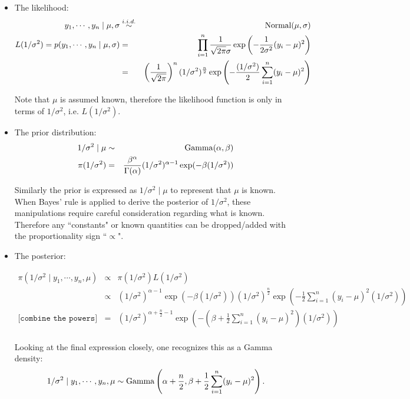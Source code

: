 \documentclass[11pt]{article}
\begin{document}
\begin{itemize}
\item The likelihood:
\begin{eqnarray}
y_1, \cdots, y_n \mid \mu, \sigma &\overset{i.i.d.}{\sim}& {\rm{Normal}}(\mu, \sigma)\\%
L(1/\sigma^2) = p(y_1, \cdots, y_n \mid \mu, \sigma) &=& \prod_{i=1}^{n} \frac{1}{\sqrt{2\pi}\sigma}\exp\left(-\frac{1}{2\sigma^2}(y_i-\mu)^2\right) \nonumber \\
&=& \left(\frac{1}{\sqrt{2\pi}}\right)^n (1/\sigma^2)^{\frac{n}{2}} \exp\left(-\frac{(1/\sigma^2)}{2}\sum_{i=1}^{n}(y_i - \mu)^2\right) \nonumber \\
\end{eqnarray}


Note that $\mu$ is assumed known, therefore the likelihood function is only in terms of $1/\sigma^2$, i.e. $L(1/\sigma^2)$.


\item The prior distribution:
\begin{eqnarray}
1/\sigma^2 \mid \mu &\sim& {\rm{Gamma}}(\alpha, \beta) \\%
\pi(1/\sigma^2) &=& \frac{\beta^{\alpha}}{\Gamma(\alpha)}(1/\sigma^2)^{\alpha-1}\exp(-\beta (1/\sigma^2))
\end{eqnarray}


Similarly the prior is expressed as $1/\sigma^2 \mid \mu$ to represent that $\mu$ is known. When Bayes' rule is applied to derive the posterior of $1/\sigma^2$, these manipulations require careful consideration regarding what is known.   Therefore any ``constants" or known quantities can be dropped/added with the proportionality sign ``$\propto$". 



\item The posterior:

\begin{eqnarray}
\pi(1/\sigma^2 \mid y_1, \cdots, y_n, \mu) &\propto&  \pi(1/\sigma^2) L(1/\sigma^2) \nonumber \\
&\propto& (1/\sigma^2)^{\alpha-1}\exp(-\beta(1/\sigma^2)) (1/\sigma^2)^{\frac{n}{2}}\exp\left(-\frac{1}{2}\sum_{i=1}^{n}(y_i-\mu)^2(1/\sigma^2)\right) \nonumber \\
\texttt{[combine the powers]} &=& (1/\sigma^2)^{\alpha + \frac{n}{2} - 1} \exp\left(-\left(\beta+\frac{1}{2}\sum_{i=1}^{n}(y_i-\mu)^2\right)(1/\sigma^2)\right) \nonumber \\
\end{eqnarray}


Looking at the final expression closely, one recognizes this as a Gamma density:
\begin{eqnarray}
1/\sigma^2 \mid y_1, \cdots, y_n, \mu \sim {\rm{Gamma}}\left(\alpha + \frac{n}{2}, \beta + \frac{1}{2}\sum_{i=1}^{n}(y_i-\mu)^2\right).
\end{eqnarray}



\end{itemize}
\end{document}
